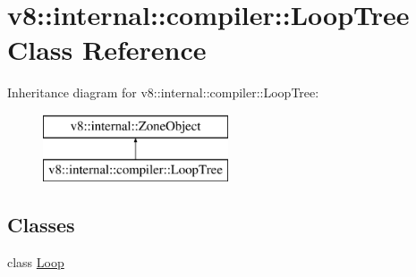 \hypertarget{classv8_1_1internal_1_1compiler_1_1_loop_tree}{}\section{v8\+:\+:internal\+:\+:compiler\+:\+:Loop\+Tree Class Reference}
\label{classv8_1_1internal_1_1compiler_1_1_loop_tree}
Inheritance diagram for v8\+:\+:internal\+:\+:compiler\+:\+:Loop\+Tree\+:\begin{figure}[H]
\begin{center}
\leavevmode
\includegraphics[height=2.000000cm]{classv8_1_1internal_1_1compiler_1_1_loop_tree}
\end{center}
\end{figure}
\subsection*{Classes}
\begin{DoxyCompactItemize}
\item 
class \hyperlink{classv8_1_1internal_1_1compiler_1_1_loop_tree_1_1_loop}{Loop}
\end{DoxyCompactItemize}
